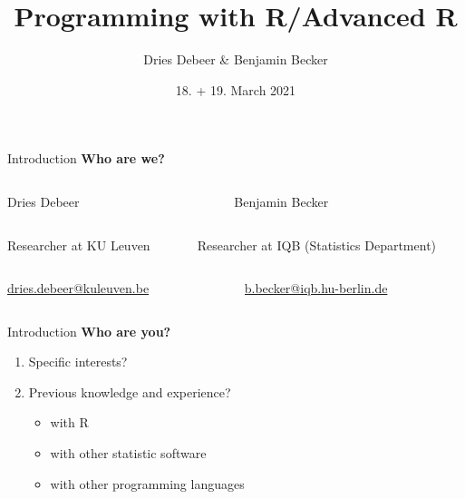 \documentclass[xcolor=table]{beamer}\usepackage[]{graphicx}\usepackage[]{color}
\begin{document}

\title{Programming with R/Advanced R}


\author[Dries Debeer \& Benjamin Becker]{Dries Debeer \& Benjamin Becker}
\date{18. + 19. March 2021}


\begin{frame}
\titlepage
\end{frame}
\addtocounter{framenumber}{-1}

\begin{frame}{Introduction}
\textbf{Who are we?}

\begin{columns}[t]
\begin{column}{.475\textwidth}
\textcolor{mLightBrown}{Dries Debeer}
\end{column}
  \begin{column}{.475\textwidth}
    \textcolor{mLightBrown}{Benjamin Becker}
  \end{column}
\end{columns}

\begin{columns}[t]
\begin{column}{.475\textwidth}
Researcher at KU Leuven
  	
\end{column}
\begin{column}{.475\textwidth}
Researcher at IQB (Statistics Department)

  \end{column}
\end{columns}

\begin{columns}[t]
\begin{column}{.475\textwidth}

\href{mailto:dries.debeer@kuleuven.be}{dries.debeer@kuleuven.be}
  	
\end{column}
  \begin{column}{.475\textwidth}

\href{b.becker@iqb.hu-berlin.de}{b.becker@iqb.hu-berlin.de}

  \end{column}
\end{columns}

\vspace{1.5em}
\end{frame}

\begin{frame}{Introduction}
\textbf{Who are you?}
\begin{enumerate}%
	\item Specific interests?
	\item Previous knowledge and experience?
	\begin{itemize}
	  \item with R
	  \item with other statistic software
	  \item with other programming languages
	\end{itemize}
\end{enumerate}

\end{frame}
\end{document}
